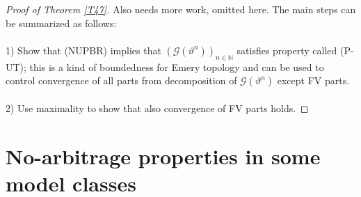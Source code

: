 \documentclass[12pt,a4paper, twoside]{article}
\theoremstyle{definition}
\begin{document}
\begin{proof}[Proof of Theorem \ref{T47}] Also needs more work, omitted here. The main steps can be summarized as follows:
\\\\
1) Show that (NUPBR) implies that $( \mathcal{G}( \vartheta^n))_{n \in \mathbb{N}}$ satisfies property called (P-UT); this is a kind of boundedness for Emery topology and can be used to control convergence of all parts from decomposition of $\mathcal{G}( \vartheta^n)$ except FV parts.
\\\\
2) Use maximality to show that also convergence of FV parts holds. 
\end{proof}
\newpage
\section{No-arbitrage properties in some model classes}
\end{document}
